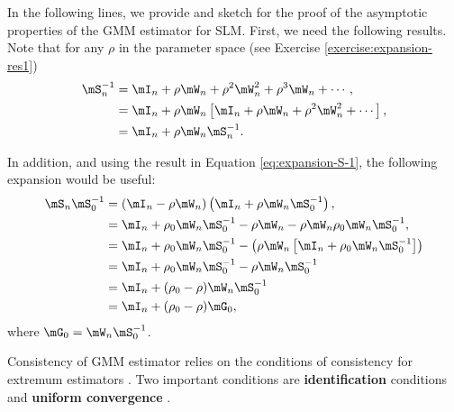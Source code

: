 In the following lines, we provide and sketch for the proof of the asymptotic properties of the GMM estimator for SLM. First,  we need the following results. Note that for any $\rho$ in the parameter space (see Exercise \ref{exercise:expansion-res1})
\begin{equation}\label{eq:expansion-S-1}
\begin{aligned}
  \mS_n^{-1} & = \mI_n + \rho\mW_n + \rho^2\mW_n^2 + \rho^3\mW_n + \cdots, \\
  & = \mI_n + \rho\mW_n\left[\mI_n + \rho\mW_n + \rho^2\mW_n^2 + \cdots\right], \\
  & = \mI_n + \rho\mW_n\mS_n^{-1}.
\end{aligned}
\end{equation}

In addition, and using the result in Equation \eqref{eq:expansion-S-1}, the following expansion would be useful:
\begin{equation}\label{eq:expansion-S-2}
\begin{aligned}
  \mS_n\mS_0^{-1}& = \left(\mI_n - \rho \mW_n\right)\left(\mI_n + \rho\mW_n\mS_0^{-1}\right),  \\
                 & = \mI_n + \rho_0\mW_n\mS_0^{-1} - \rho\mW_n - \rho\mW_n\rho_0\mW_n\mS_0^{-1}, \\
                 & = \mI_n + \rho_0\mW_n\mS_0^{-1} - \left(\rho\mW_n\left[\mI_n + \rho_0\mW_n\mS_0^{-1}\right]\right) \\
                 & = \mI_n + \rho_0\mW_n\mS_0^{-1} - \rho\mW_n\mS_0^{-1} \\
                 & = \mI_n + (\rho_0 - \rho)\mW_n\mS_0^{-1} \\
                 & = \mI_n + (\rho_0 - \rho)\mG_0, \\
\end{aligned}                 
\end{equation}
%
where $\mG_0 = \mW_n\mS_0^{-1}$.

Consistency of GMM estimator relies on the conditions of consistency for extremum estimators \citep{hansen1982large, newey1994large}. Two important conditions are \textbf{identification} conditions and \textbf{uniform convergence} \citep{lee2003best, lee2007gmm}. 

